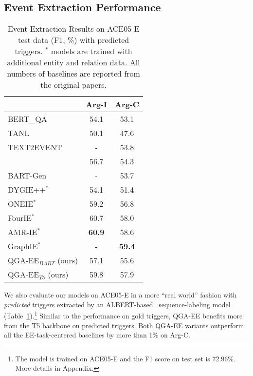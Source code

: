 \subsection{Event Extraction Performance}

\begin{table}[!th]
    \centering
    \small
    \begin{tabular}{l|c|c}
    \hline
    {} & {Arg-I} & {Arg-C}\\
    \hline
         {BERT\_QA~\cite{du2020event}}&{54.1}&{53.1}  \\
         {TANL~\cite{paolini2021structured}}& {50.1} & {47.6}\\
         {TEXT2EVENT~\cite{lu2021text2event}}& {-} & {53.8}\\
         {\citet{ma2020resource}}& {56.7} & {54.3}\\
         {BART-Gen~\cite{li2021document}}& {-} & {53.7}\\
    \hline
         {DYGIE++$^{*}$~\cite{wadden2019entity}}&{54.1}&{51.4}  \\
         {ONEIE$^{*}$~\cite{lin2020joint}} & {59.2} & {56.8}\\
         {FourIE$^{*}$~\cite{van2021cross}} & {{60.7}} & {{58.0}}\\
         {AMR-IE$^{*}$~\cite{zhang2021abstract}} & {\textbf{60.9}} & {{58.6}}\\
         {GraphIE$^{*}$~\cite{van2022joint}} & {\textbf{-}} & {\textbf{59.4}}\\
         
         \hline
        {QGA-EE$_{BART}$ (ours)} & {57.1}& {55.6} \\
        {QGA-EE$_{T5}$ (ours)} & {59.8} & {57.9} \\
        
   
 
    \hline
    \end{tabular}
    \caption{Event Extraction Results on ACE05-E test data (F1, \%) with predicted triggers. $^{*}$ models are trained with additional entity and relation data. All numbers of baselines are reported from the original papers.}
    \label{tab:arg_overall}
\end{table}
We also evaluate our models on ACE05-E  in a more ``real world'' fashion with \textit{predicted} triggers extracted by an ALBERT-based~\cite{lan2019albert} sequence-labeling model (Table~\ref{tab:arg_overall}).\footnote{The model is trained on ACE05-E and the F1 score on test set is 72.96\%. More details in Appendix.}
Similar to the performance on gold triggers, QGA-EE benefits more from the T5 backbone on predicted triggers. Both QGA-EE variants outperform all the EE-task-centered baselines by more than 1\% on Arg-C. 

